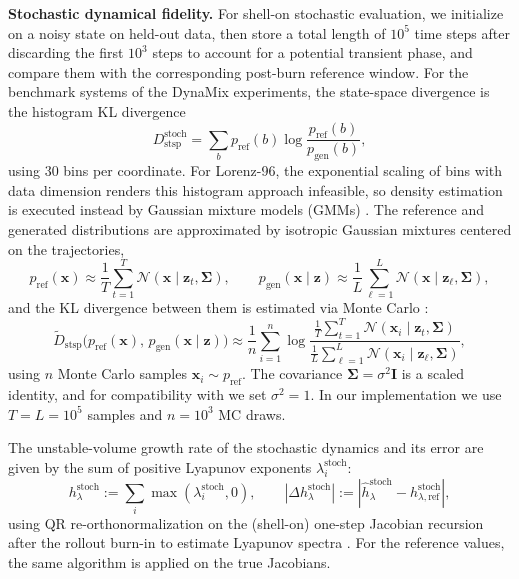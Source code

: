 \documentclass{article}
\theoremstyle{plain}
\theoremstyle{definition}
\theoremstyle{remark}
\begin{document}
\textbf{Stochastic dynamical fidelity.}
For shell-on stochastic evaluation, we initialize on a noisy state on held-out data, then store a total length of $10^5$ time steps after discarding the first $10^3$ steps to account for a potential transient phase, and compare them with the corresponding post-burn reference window. For the benchmark systems of the DynaMix experiments, the state-space divergence is the histogram KL divergence
\[
D_{\mathrm{stsp}}^{\mathrm{stoch}}
=
\sum_b p_{\mathrm{ref}}(b)
\log\frac{p_{\mathrm{ref}}(b)}{p_{\mathrm{gen}}(b)},
\]
using $30$ bins per coordinate. For Lorenz-96, the exponential scaling of bins with data dimension renders this histogram approach infeasible, so density estimation is executed instead by Gaussian mixture models (GMMs) \citep{koppe2019identifying,hess2023generalized,brenner2024almostlinear}. The reference and generated distributions are approximated by isotropic Gaussian mixtures centered on the trajectories,
\begin{equation}
p_{\mathrm{ref}}(\bm x)\approx\frac{1}{T}\sum_{t=1}^{T}\mathcal{N}(\bm x\mid\bm z_t,\bm\Sigma),
\qquad
p_{\mathrm{gen}}(\bm x\mid\bm z)\approx\frac{1}{L}\sum_{\ell=1}^{L}\mathcal{N}(\bm x\mid\bm z_\ell,\bm\Sigma),
\end{equation}
and the KL divergence between them is estimated via Monte Carlo \citep{hershey2007approximating}:
\begin{equation}
\tilde{D}_{\mathrm{stsp}} \big(p_{\mathrm{ref}}(\bm x),\,p_{\mathrm{gen}}(\bm x\mid\bm z)\big)
\approx
\frac{1}{n}\sum_{i=1}^{n}\log
\frac{\tfrac{1}{T}\sum_{t=1}^{T}\mathcal{N}(\bm x_i\mid\bm z_t,\bm\Sigma)}
     {\tfrac{1}{L}\sum_{\ell=1}^{L}\mathcal{N}(\bm x_i\mid\bm z_\ell,\bm\Sigma)},
\label{eq:kl_mc}
\end{equation}
using $n$ Monte Carlo samples $\bm x_i\sim p_{\mathrm{ref}}$. The covariance $\bm\Sigma=\sigma^2\bm I$ is a scaled identity, and for compatibility with \citep{hess2023generalized,brenner2024almostlinear} we set $\sigma^2=1$. In our implementation we use $T=L=10^5$ samples and $n=10^3$ MC draws.

The unstable-volume growth rate of the stochastic dynamics and its error are given by the sum of positive Lyapunov exponents $\lambda^\mathrm{stoch}_i$:
\[
h^\mathrm{stoch}_\lambda:=\sum_i \max(\lambda_i^\mathrm{stoch},0),
\qquad
|\Delta h^\mathrm{stoch}_\lambda|:=|\hat h^\mathrm{stoch}_\lambda-h^\mathrm{stoch}_{\lambda,\mathrm{ref}}|,
\]
using QR re-orthonormalization on the (shell-on) one-step Jacobian recursion after the rollout burn-in to estimate Lyapunov spectra \citep{benettin1980lyapunov,geist1990comparison}. For the reference values, the same algorithm is applied on the true Jacobians. 
\end{document}
